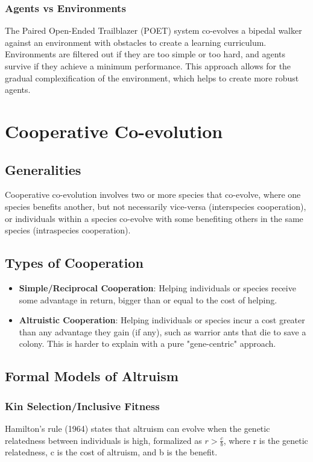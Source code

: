 \subsubsection*{Agents vs Environments}
The Paired Open-Ended Trailblazer (POET) system co-evolves a bipedal walker against an environment with obstacles to create a learning curriculum. Environments are filtered out if they are too simple or too hard, and agents survive if they achieve a minimum performance. This approach allows for the gradual complexification of the environment, which helps to create more robust agents.

\section{Cooperative Co-evolution}

\subsection*{Generalities}

Cooperative co-evolution involves two or more species that co-evolve, where one species benefits another, but not necessarily vice-versa (interspecies cooperation), or individuals within a species co-evolve with some benefiting others in the same species (intraspecies cooperation).

\subsection*{Types of Cooperation}

\begin{itemize}
    \item \textbf{Simple/Reciprocal Cooperation}: Helping individuals or species receive some advantage in return, bigger than or equal to the cost of helping.
    \item \textbf{Altruistic Cooperation}:  Helping individuals or species incur a cost greater than any advantage they gain (if any), such as warrior ants that die to save a colony.  This is harder to explain with a pure "gene-centric" approach.
\end{itemize}

\subsection*{Formal Models of Altruism}

\subsubsection*{Kin Selection/Inclusive Fitness}
Hamilton’s rule (1964) states that altruism can evolve when the genetic relatedness between individuals is high, formalized as $r > \frac{c}{b}$, where r is the genetic relatedness, c is the cost of altruism, and b is the benefit.

